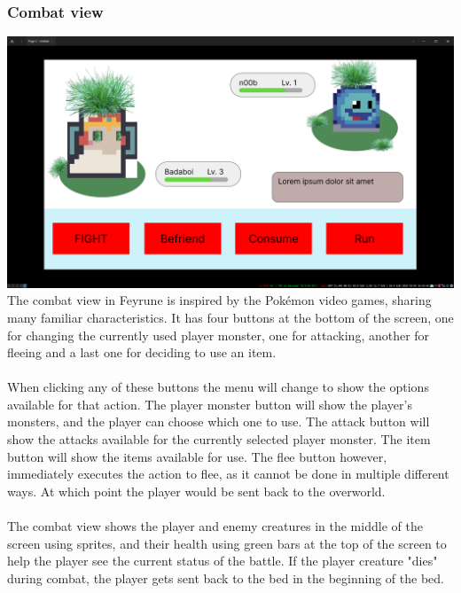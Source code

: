 \subsubsection{Combat view}
\includegraphics[width=\textwidth]{images/combat_figma.png}\\
The combat view in Feyrune is inspired by the Pokémon video games, sharing many familiar characteristics. It has four buttons at the bottom of the screen, one for changing the currently used player monster, one for attacking, another for fleeing and a last one for deciding to use an item.\\
\\
When clicking any of these buttons the menu will change to show the options available for that action. The player monster button will show the player's monsters, and the player can choose which one to use. The attack button will show the attacks available for the currently selected player monster. The item button will show the items available for use. The flee button however, immediately executes the action to flee, as it cannot be done in multiple different ways. At which point the player would be sent back to the overworld.\\
\\
The combat view shows the player and enemy creatures in the middle of the screen using sprites, and their health using green bars at the top of the screen to help the player see the current status of the battle. If the player creature "dies" during combat, the player gets sent back to the bed in the beginning of the bed.\\
\\
